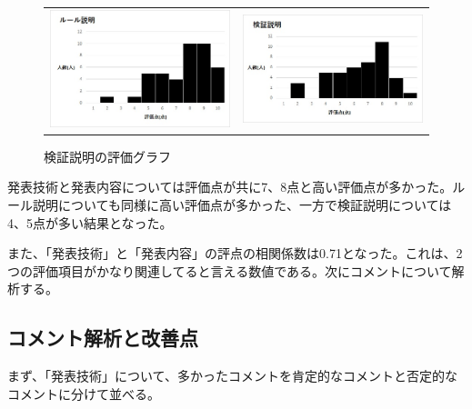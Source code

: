 \begin{figure}[h]
 \begin{tabular}{cc}
  \begin{minipage}[h]{0.45\hsize}
  \centering
 \includegraphics[width=0.7\linewidth]{./figure/ru-ru.jpg}
\caption{ルール説明の評価グラフ}
\label{ru-ru}
 \end{minipage} &

\begin{minipage}[h]{0.45\hsize}
  \centering
 \includegraphics[width=0.7\linewidth]{./figure/kensyou.jpg}
 \caption{検証説明の評価グラフ}
\label{kensyou}
\end{minipage} 
\end{tabular}
\end{figure}
発表技術と発表内容については評価点が共に7、8点と高い評価点が多かった。ルール説明についても同様に高い評価点が多かった、一方で検証説明については4、5点が多い結果となった。

また、「発表技術」と「発表内容」の評点の相関係数は0.71となった。これは、2つの評価項目がかなり関連してると言える数値である。次にコメントについて解析する。


\subsection{コメント解析と改善点}
まず、「発表技術」について、多かったコメントを肯定的なコメントと否定的なコメントに分けて並べる。

